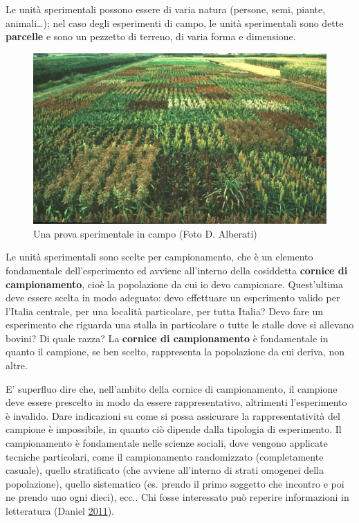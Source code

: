 \documentclass[a4paper,12pt,oneside]{book}
\theoremstyle{definition}
\theoremstyle{definition}
\theoremstyle{definition}
\theoremstyle{remark}
\begin{document}
Le unità sperimentali possono essere di varia natura (persone, semi,
piante, animali\ldots{}); nel caso degli esperimenti di campo, le unità
sperimentali sono dette \textbf{parcelle} e sono un pezzetto di terreno,
di varia forma e dimensione.

\begin{figure}

{\centering \includegraphics[width=0.9\linewidth]{_images/SorgoProveVarietali} 

}

\caption{Una prova sperimentale in campo (Foto D. Alberati)}\label{fig:figName21}
\end{figure}

Le unità sperimentali sono scelte per campionamento, che è un elemento
fondamentale dell'esperimento ed avviene all'interno della cosiddetta
\textbf{cornice di campionamento}, cioè la popolazione da cui io devo
campionare. Quest'ultima deve essere scelta in modo adeguato: devo
effettuare un esperimento valido per l'Italia centrale, per una località
particolare, per tutta Italia? Devo fare un esperimento che riguarda una
stalla in particolare o tutte le stalle dove si allevano bovini? Di
quale razza? La \textbf{cornice di campionamento} è fondamentale in
quanto il campione, se ben scelto, rappresenta la popolazione da cui
deriva, non altre.

E' superfluo dire che, nell'ambito della cornice di campionamento, il
campione deve essere prescelto in modo da essere rappresentativo,
altrimenti l'esperimento è invalido. Dare indicazioni su come si possa
assicurare la rappresentatività del campione è impossibile, in quanto
ciò dipende dalla tipologia di esperimento. Il campionamento è
fondamentale nelle scienze sociali, dove vengono applicate tecniche
particolari, come il campionamento randomizzato (completamente casuale),
quello stratificato (che avviene all'interno di strati omogenei della
popolazione), quello sistematico (es. prendo il primo soggetto che
incontro e poi ne prendo uno ogni dieci), ecc.. Chi fosse interessato
può reperire informazioni in letteratura (Daniel
\protect\hyperlink{ref-DanielSamplingessentialspractical2011}{2011}).
\end{document}

